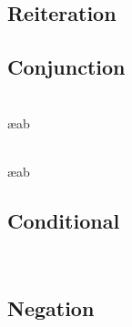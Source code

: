 \begin{multicols}{2}
\subsection*{Reiteration}

\begin{fitchproof}
	 
\end{fitchproof}

\subsection*{Conjunction}

\begin{fitchproof}
	 

\\	 \ae{ab}

\\	 \ae{ab}
\end{fitchproof}

\subsection*{Conditional}

\begin{fitchproof}
	\open
	\close

\\	
	 
\end{fitchproof}

\subsection*{Negation}

\begin{fitchproof}
\open
\close
{}

\\ 
\end{fitchproof}


\end{multicols}
